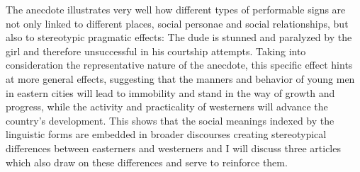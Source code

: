 The anecdote illustrates very well how different types of performable signs are not only linked to different places, social personae and social relationships, but also to stereotypic pragmatic effects: The dude is stunned and paralyzed by the girl and therefore unsuccessful in his courtship attempts. Taking into consideration the representative nature of the anecdote, this specific effect hints at more general effects, suggesting that the manners and behavior of young men in eastern cities will lead to immobility and stand in the way of growth and progress, while the activity and practicality of westerners will advance the country’s development. This shows that the social meanings indexed by the linguistic forms are embedded in broader discourses creating stereotypical differences between easterners and westerners and I will discuss three articles which also draw on these differences and serve to reinforce them.

